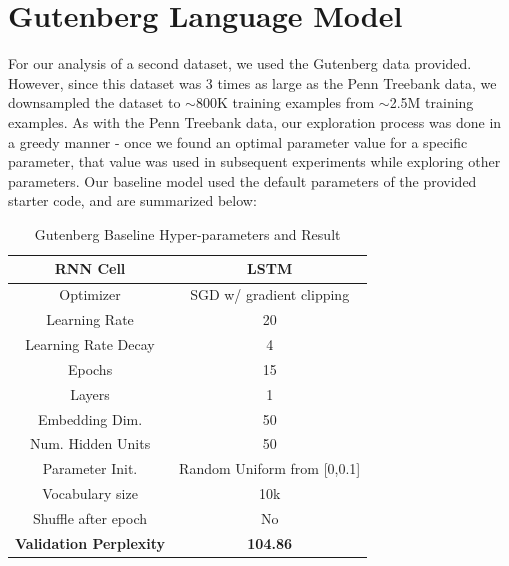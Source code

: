 \documentclass[a4paper]{article}
\begin{document}
\section*{Gutenberg Language Model}
For our analysis of a second dataset, we used the Gutenberg data provided. However, since this dataset was 3 times as large as the Penn Treebank data, we downsampled the dataset to $\sim$800K training examples from $\sim$2.5M training examples. As with the Penn Treebank data, our exploration process was done in a greedy manner - once we found an optimal parameter value for a specific parameter, that value was used in subsequent experiments while exploring other parameters. Our baseline model used the default parameters of the provided starter code, and are summarized below:

\begin{table}[H]
\centering
\begin{tabular}{|c | c|} 
 \hline
RNN Cell & LSTM\\ \hline
Optimizer & SGD w/ gradient clipping \\ \hline
Learning Rate & 20 \\ \hline
Learning Rate Decay & 4 \\ \hline
Epochs & 15\\ \hline
Layers & 1\\ \hline
Embedding Dim. & 50\\ \hline
Num. Hidden Units & 50\\ \hline
Parameter Init. & Random Uniform from [0,0.1]\\ \hline
Vocabulary size & 10k\\ \hline
Shuffle after epoch & No \\ \hline
\textbf{Validation Perplexity} &\textbf{104.86} \\ \hline
\end{tabular}
\caption{Gutenberg Baseline Hyper-parameters and Result}
\label{table:1}
\end{table}
\end{document}
